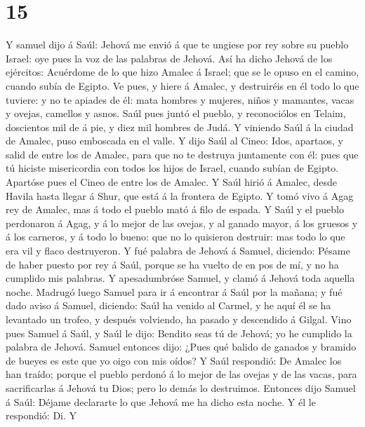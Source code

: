 \hypertarget{section-14}{%
\section{15}\label{section-14}}

 Y samuel dijo á Saúl: Jehová me envió á que te ungiese por
rey sobre su pueblo Israel: oye pues la voz de las palabras de Jehová.
 Así ha dicho Jehová de los ejércitos: Acuérdome de lo que
hizo Amalec á Israel; que se le opuso en el camino, cuando subía de
Egipto.  Ve pues, y hiere á Amalec, y destruiréis en él todo
lo que tuviere: y no te apiades de él: mata hombres y mujeres, niños y
mamantes, vacas y ovejas, camellos y asnos.  Saúl pues juntó
el pueblo, y reconociólos en Telaim, doscientos mil de á pie, y diez mil
hombres de Judá.  Y viniendo Saúl á la ciudad de Amalec,
puso emboscada en el valle.  Y dijo Saúl al Cineo: Idos,
apartaos, y salid de entre los de Amalec, para que no te destruya
juntamente con él: pues que tú hiciste misericordia con todos los hijos
de Israel, cuando subían de Egipto. Apartóse pues el Cineo de entre los
de Amalec.  Y Saúl hirió á Amalec, desde Havila hasta llegar
á Shur, que está á la frontera de Egipto.  Y tomó vivo á
Agag rey de Amalec, mas á todo el pueblo mató á filo de espada.
 Y Saúl y el pueblo perdonaron á Agag, y á lo mejor de las
ovejas, y al ganado mayor, á los gruesos y á los carneros, y á todo lo
bueno: que no lo quisieron destruir: mas todo lo que era vil y flaco
destruyeron.  Y fué palabra de Jehová á Samuel, diciendo:
 Pésame de haber puesto por rey á Saúl, porque se ha vuelto
de en pos de mí, y no ha cumplido mis palabras. Y apesadumbróse Samuel,
y clamó á Jehová toda aquella noche.  Madrugó luego Samuel
para ir á encontrar á Saúl por la mañana; y fué dado aviso á Samuel,
diciendo: Saúl ha venido al Carmel, y he aquí él se ha levantado un
trofeo, y después volviendo, ha pasado y descendido á Gilgal.
 Vino pues Samuel á Saúl, y Saúl le dijo: Bendito seas tú
de Jehová; yo he cumplido la palabra de Jehová.  Samuel
entonces dijo: ¿Pues qué balido de ganados y bramido de bueyes es este
que yo oigo con mis oídos?  Y Saúl respondió: De Amalec los
han traído; porque el pueblo perdonó á lo mejor de las ovejas y de las
vacas, para sacrificarlas á Jehová tu Dios; pero lo demás lo destruimos.
 Entonces dijo Samuel á Saúl: Déjame declararte lo que
Jehová me ha dicho esta noche. Y él le respondió: Di.  Y

